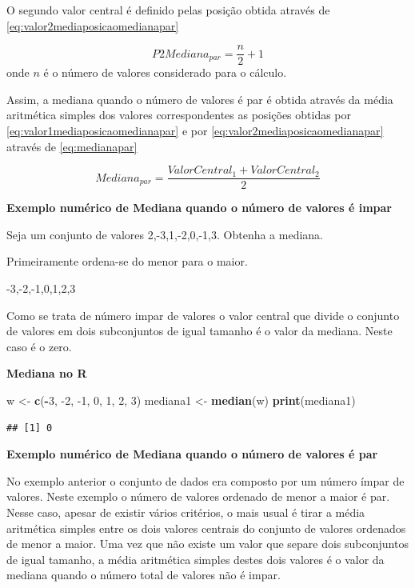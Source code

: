 \documentclass[
]{book}
\newenvironment{Shaded}{\begin{snugshade}}{\end{snugshade}}
\newcommand{\DecValTok}[1]{\textcolor[rgb]{0.00,0.00,0.81}{#1}}
\newcommand{\KeywordTok}[1]{\textcolor[rgb]{0.13,0.29,0.53}{\textbf{#1}}}
\newcommand{\NormalTok}[1]{#1}
\newcommand{\OperatorTok}[1]{\textcolor[rgb]{0.81,0.36,0.00}{\textbf{#1}}}
\newcommand{\StringTok}[1]{\textcolor[rgb]{0.31,0.60,0.02}{#1}}
\begin{document}
O segundo valor central é definido pelas posição obtida através de
\eqref{eq:valor2mediaposicaomedianapar}

\begin{equation}
  P2Mediana_{par} = \dfrac{n}{2} + 1
  \label{eq:valor2mediaposicaomedianapar}
\end{equation}
onde \(n\) é o número de valores considerado para o cálculo.

Assim, a mediana quando o número de valores é par é obtida através da média aritmética simples dos valores correspondentes as posições obtidas por \eqref{eq:valor1mediaposicaomedianapar} e por
\eqref{eq:valor2mediaposicaomedianapar} através de \eqref{eq:medianapar}

\begin{equation}
  Mediana_{par} = \dfrac{ValorCentral_1 + ValorCentral_2}{2}
  \label{eq:medianapar}
\end{equation}

\textbf{Exemplo numérico de Mediana quando o número de valores é impar}

Seja um conjunto de valores 2,-3,1,-2,0,-1,3. Obtenha a mediana.

Primeiramente ordena-se do menor para o maior.

-3,-2,-1,0,1,2,3

Como se trata de número impar de valores o valor central que divide o conjunto de valores em dois subconjuntos de igual tamanho é o valor da mediana. Neste caso é o zero.

\textbf{Mediana no R}

\begin{Shaded}
\begin{Highlighting}[]
\NormalTok{w <-}\StringTok{ }\KeywordTok{c}\NormalTok{(}\OperatorTok{-}\DecValTok{3}\NormalTok{, }\DecValTok{-2}\NormalTok{, }\DecValTok{-1}\NormalTok{, }\DecValTok{0}\NormalTok{, }\DecValTok{1}\NormalTok{, }\DecValTok{2}\NormalTok{, }\DecValTok{3}\NormalTok{)}
\NormalTok{mediana1 <-}\StringTok{ }\KeywordTok{median}\NormalTok{(w)}
\KeywordTok{print}\NormalTok{(mediana1)}
\end{Highlighting}
\end{Shaded}

\begin{verbatim}
## [1] 0
\end{verbatim}

\textbf{Exemplo numérico de Mediana quando o número de valores é par}

No exemplo anterior o conjunto de dados era composto por um número ímpar de valores. Neste exemplo o número de valores ordenado de menor a maior é par. Nesse caso, apesar de existir vários critérios, o mais usual é tirar a média aritmética simples entre os dois valores centrais do conjunto de valores ordenados de menor a maior. Uma vez que não existe um valor que separe dois subconjuntos de igual tamanho, a média aritmética simples destes dois valores é o valor da mediana quando o número total de valores não é impar.
\end{document}
